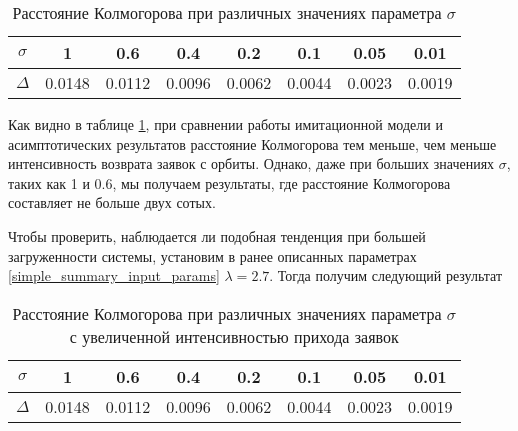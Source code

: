 \begin{table}[h!] 
	\centering
	\caption{Расстояние Колмогорова при различных значениях параметра $\sigma$}
	\label{table_simple_summary}
	\begin{tabular}{ | c | c | c | c | c | c | c | c |}
		\hline
		$\sigma$ & 1 & 0.6 & 0.4 & 0.2 & 0.1 & 0.05 & 0.01 \\ 
		\hline
		$\Delta$ & 0.0148 & 0.0112 & 0.0096 & 0.0062 & 0.0044 & 0.0023 & 0.0019\\
		\hline
	\end{tabular}
\end{table}

Как видно в таблице \ref{table_simple_summary}, при сравнении работы имитационной модели и асимптотических результатов расстояние Колмогорова тем меньше, чем меньше интенсивность возврата заявок с орбиты. Однако, даже при больших значениях $\sigma$, таких как 1 и 0.6, мы получаем результаты, где расстояние Колмогорова составляет не больше двух сотых. 

Чтобы проверить, наблюдается ли подобная тенденция при большей загруженности системы, установим в ранее описанных параметрах \eqref{simple_summary_input_params} $\lambda = 2.7$. Тогда получим следующий результат

\begin{table}[h!] 
	\centering
	\caption{Расстояние Колмогорова при различных значениях параметра $\sigma$ с увеличенной интенсивностью прихода заявок}
	\label{table_simple_summary_high_lambda}
	\begin{tabular}{ | c | c | c | c | c | c | c | c |}
		\hline
		$\sigma$ & 1 & 0.6 & 0.4 & 0.2 & 0.1 & 0.05 & 0.01 \\ 
		\hline
		$\Delta$ & 0.0148 & 0.0112 & 0.0096 & 0.0062 & 0.0044 & 0.0023 & 0.0019\\
		\hline
	\end{tabular}
\end{table}

